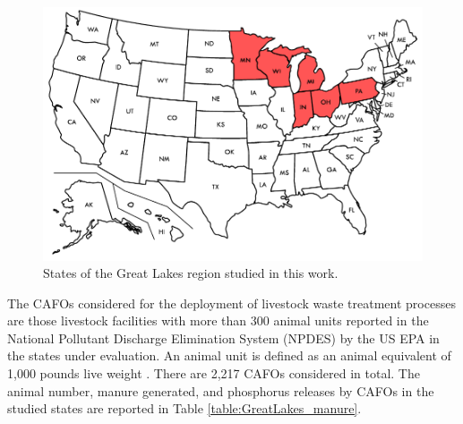 \begin{refsection}[referencesCh5]
\begin{figure}[h!]
	\centering
	\includegraphics[width=0.65\linewidth, trim={0cm 0cm 0cm 0cm},clip]{gfx/Chapter5/Blank_US_map_borders_labelsClean.pdf} 
	\caption{States of the Great Lakes region studied in this work.}
	\label{fig:states}
\end{figure}

The CAFOs considered for the deployment of livestock waste treatment processes are those livestock facilities with more than 300 animal units \citep{CAFO_definition} reported in the National Pollutant Discharge Elimination System (NPDES) by the US EPA in the 
states under evaluation. An animal unit is defined as an animal equivalent of 1,000 pounds live weight \citep{animal_unit_definition}. There are 2,217 CAFOs considered in total.
The animal number, manure generated, and phosphorus releases by CAFOs in the studied states are reported in Table \ref{table:GreatLakes_manure}.

\begin{table}[h]
	\centering
	\caption{Livestock residues and phosphorus releases by CAFOs in the Great Lakes area.}
	\label{table:GreatLakes_manure}
\end{table}
\end{refsection}
